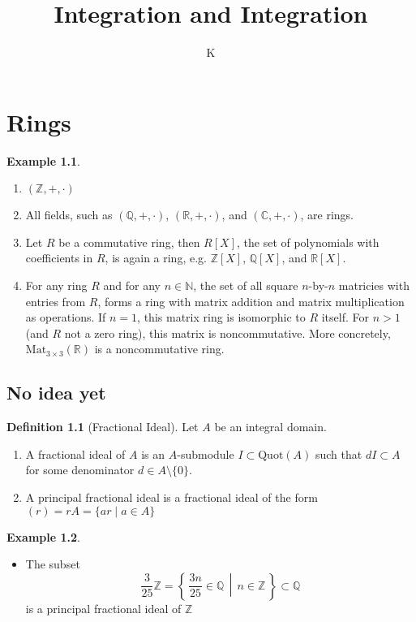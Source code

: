 \documentclass[a4paper]{book}
\title{Integration and Integration}
\author{K}
\theoremstyle{definition}
\newtheorem{definition}{Definition}[chapter]
\newtheorem{example}{Example}[definition]
\begin{document}

\chapter{Rings}

\begin{example}
    \begin{enumerate}
        \item \((\mathbb{Z}, +, \cdot)\)
        \item All fields, such as \((\mathbb{Q}, +, \cdot)\), \((\mathbb{R}, +, \cdot)\), and \((\mathbb{C}, +, \cdot)\), are rings.
        \item Let \(R\) be a commutative ring, then \(R[X]\), the set of polynomials with coefficients in \(R\), is again a ring, e.g. \(\mathbb{Z}[X]\), \(\mathbb{Q}[X]\), and \(\mathbb{R}[X]\).
        \item For any ring \(R\) and for any \(n \in \mathbb{N}\), the set of all square \(n\)-by-\(n\) matricies with entries from \(R\), forms a ring with matrix addition and matrix multiplication as operations. If \(n = 1\), this matrix ring is isomorphic to \(R\) itself. For \(n > 1\) (and \(R\) not a zero ring), this matrix is noncommutative. More concretely, \(\text{Mat}_{3 \times 3}(\mathbb{R})\) is a noncommutative ring. 
    \end{enumerate}
\end{example}

\section{No idea yet}

\begin{definition}[Fractional Ideal]
    Let \(A\) be an {\color{mathif}integral domain}.
    \begin{enumerate}
        \item A {\color{maththen}fractional ideal} of \(A\) is an {\color{mathif}\(A\)-submodule} \(I \subset \text{Quot}(A)\) such that \(d I \subset A\) for some {\color{mathrem}denominator} \(d \in A \setminus \{0\}\).
        \item A {\color{maththen}principal fractional ideal} is a {\color{mathif}fractional ideal} of the form \((r) = rA = \{ar \mid a \in A\}\)
    \end{enumerate}
    

\end{definition}

\begin{example}
    \begin{itemize}
        \item The subset
        \begin{equation}
            \frac{3}{25}\mathbb{Z} = \left\{\, \frac{3n}{25} \in \mathbb{Q} \,\middle|\, n \in \mathbb{Z} \,\right\} \subset \mathbb{Q}
        \end{equation}
        is a principal fractional ideal of \(\mathbb{Z}\)
    \end{itemize}
\end{example}
\end{document}
